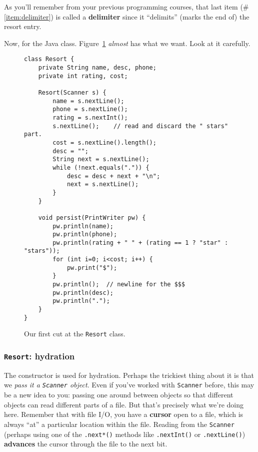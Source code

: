 As you'll remember from your previous programming courses, that last item
(\#\ref{item:delimiter}) is called a \textbf{delimiter} since it ``delimits''
(marks the end of) the resort entry.

Now, for the Java class. Figure~\ref{fig:resort1} \textit{almost} has what we
want. Look at it carefully.

\begin{figure}[ht]
\centering
\begin{Verbatim}[fontsize=\footnotesize,samepage=true,frame=single]
class Resort {
    private String name, desc, phone;
    private int rating, cost;

    Resort(Scanner s) {
        name = s.nextLine();
        phone = s.nextLine();
        rating = s.nextInt();
        s.nextLine();    // read and discard the " stars" part.
        cost = s.nextLine().length();
        desc = "";
        String next = s.nextLine();
        while (!next.equals(".")) {
            desc = desc + next + "\n";
            next = s.nextLine();
        }
    }
    
    void persist(PrintWriter pw) {
        pw.println(name);
        pw.println(phone);
        pw.println(rating + " " + (rating == 1 ? "star" : "stars"));
        for (int i=0; i<cost; i++) {
            pw.print("$");
        }
        pw.println();  // newline for the $$$
        pw.println(desc);
        pw.println(".");
    }
}
\end{Verbatim}
\caption{Our first cut at the \texttt{Resort} class.}
\label{fig:resort1}
\end{figure}

\subsubsection{\texttt{Resort}: hydration}

The constructor is used for hydration. Perhaps the trickiest thing about it is
that we \textit{pass it a \texttt{Scanner} object}. Even if you've worked with
\texttt{Scanner} before, this may be a new idea to you: passing one around
between objects so that different objects can read different parts of a file.
But that's precisely what we're doing here. Remember that with file I/O, you
have a \textbf{cursor} open to a file, which is always ``at'' a particular
location within the file. Reading from the \texttt{Scanner} (perhaps using one
of the \texttt{.next*()} methods like \texttt{.nextInt()} or
\texttt{.nextLine()}) \textbf{advances} the cursor through the file to the
next bit.

